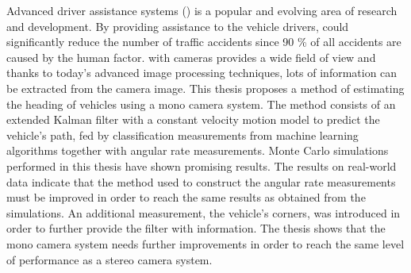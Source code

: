 Advanced driver assistance systems (\abbrADAS) is a popular and evolving area of research and development.
By providing assistance to the vehicle drivers, \abbrADAS could significantly reduce the number of traffic accidents since 90 \% of all accidents are caused by the human factor.
\abbrADAS with cameras provides a wide field of view and thanks to today's advanced image processing techniques, lots of information can be extracted from the camera image.
This thesis proposes a method of estimating the heading of vehicles using a mono camera system.
The method consists of an extended Kalman filter with a constant velocity motion model to predict the vehicle's path, fed by classification measurements from machine learning algorithms together with angular rate measurements.
Monte Carlo simulations performed in this thesis have shown promising results.
The results on real-world data indicate that the method used to construct the angular rate measurements must be improved in order to reach the same results as obtained from the simulations.
An additional measurement, the vehicle's corners, was introduced in order to further provide the filter with information.
The thesis shows that the mono camera system needs further improvements in order to reach the same level of performance as a stereo camera system.